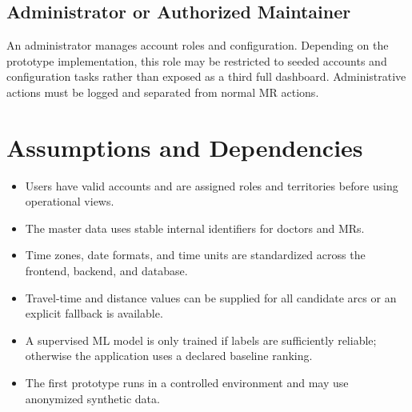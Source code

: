 \documentclass[12pt,a4paper,oneside]{report}
\begin{document}
\subsection{Administrator or Authorized Maintainer}
An administrator manages account roles and configuration. Depending on the prototype implementation, this role may be restricted to seeded accounts and configuration tasks rather than exposed as a third full dashboard. Administrative actions must be logged and separated from normal MR actions.

\section{Assumptions and Dependencies}
\begin{itemize}[leftmargin=1.2cm]
\item Users have valid accounts and are assigned roles and territories before using operational views.
\item The master data uses stable internal identifiers for doctors and MRs.
\item Time zones, date formats, and time units are standardized across the frontend, backend, and database.
\item Travel-time and distance values can be supplied for all candidate arcs or an explicit fallback is available.
\item A supervised ML model is only trained if labels are sufficiently reliable; otherwise the application uses a declared baseline ranking.
\item The first prototype runs in a controlled environment and may use anonymized synthetic data.
\end{itemize}
\end{document}
